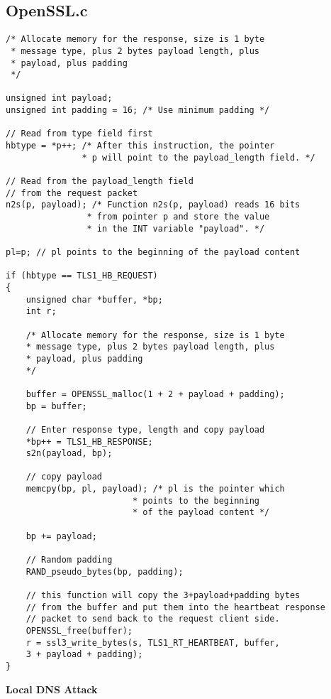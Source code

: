 \documentclass[a4paper,12pt]{article}
\begin{document}
\subsection{OpenSSL.c}
\begin{verbatim}
/* Allocate memory for the response, size is 1 byte
 * message type, plus 2 bytes payload length, plus
 * payload, plus padding
 */

unsigned int payload;
unsigned int padding = 16; /* Use minimum padding */

// Read from type field first
hbtype = *p++; /* After this instruction, the pointer
               * p will point to the payload_length field. */

// Read from the payload_length field
// from the request packet
n2s(p, payload); /* Function n2s(p, payload) reads 16 bits
                * from pointer p and store the value
                * in the INT variable "payload". */

pl=p; // pl points to the beginning of the payload content

if (hbtype == TLS1_HB_REQUEST)
{
	unsigned char *buffer, *bp;
	int r;

	/* Allocate memory for the response, size is 1 byte
	* message type, plus 2 bytes payload length, plus
	* payload, plus padding
	*/

	buffer = OPENSSL_malloc(1 + 2 + payload + padding);
	bp = buffer;

	// Enter response type, length and copy payload
	*bp++ = TLS1_HB_RESPONSE;
	s2n(payload, bp);

	// copy payload
	memcpy(bp, pl, payload); /* pl is the pointer which
	                     * points to the beginning
	                     * of the payload content */

	bp += payload;

	// Random padding
	RAND_pseudo_bytes(bp, padding);

	// this function will copy the 3+payload+padding bytes
	// from the buffer and put them into the heartbeat response
	// packet to send back to the request client side.
	OPENSSL_free(buffer);
	r = ssl3_write_bytes(s, TLS1_RT_HEARTBEAT, buffer,
	3 + payload + padding);
}
\end{verbatim}

\begin{titlepage}
		\begin{center}
		\vspace*{27em}
		\Huge
			\textbf{Local DNS Attack}
			\vfill
		\end{center}
	\end{titlepage}
	
\end{document}
